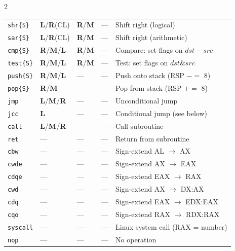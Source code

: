 \documentclass[landscape,a4paper]{article}
\newcommand{\Lc}{\textcolor{tL}{\textbf{L}}}
\newcommand{\Mc}{\textcolor{tM}{\textbf{M}}}
\newcommand{\Rc}{\textcolor{tR}{\textbf{R}}}
\begin{document}
\begin{tcolorbox}[mysec,
  title={Part 1: Instruction Set --- AT\&T: \texttt{op src, dst}
         \quad$|$\quad Intel: \texttt{op dst, src}}]
\begin{multicols}{2}
{\begin{tabular}{@{}l l l l p{9.5cm}@{}}
\texttt{shr\{S\}}  & \Lc/\Rc(CL) & \Rc/\Mc & --- & Shift right (logical) \\
\texttt{sar\{S\}}  & \Lc/\Rc(CL) & \Rc/\Mc & --- & Shift right (arithmetic) \\
\midrule
\texttt{cmp\{S\}}  & \Rc/\Mc/\Lc & \Rc/\Mc & ---
  & Compare: set flags on $dst - src$ \\
\texttt{test\{S\}} & \Rc/\Mc/\Lc & \Rc/\Mc & ---
  & Test: set flags on $dst \mathbin{\&} src$ \\
\midrule
\texttt{push\{S\}} & \Rc/\Mc/\Lc & --- & --- & Push onto stack (RSP $-=$ 8) \\
\texttt{pop\{S\}}  & \Rc/\Mc     & --- & --- & Pop from stack  (RSP $+=$ 8) \\
\midrule
\texttt{jmp}       & \Lc/\Mc/\Rc & --- & --- & Unconditional jump \\
\texttt{jcc}       & \Lc         & --- & --- & Conditional jump (see below) \\
\texttt{call}      & \Lc/\Mc/\Rc & --- & --- & Call subroutine \\
\texttt{ret}       & ---         & --- & --- & Return from subroutine \\
\midrule
\texttt{cbw}       & --- & --- & --- & Sign-extend AL $\to$ AX \\
\texttt{cwde}      & --- & --- & --- & Sign-extend AX $\to$ EAX \\
\texttt{cdqe}      & --- & --- & --- & Sign-extend EAX $\to$ RAX \\
\texttt{cwd}       & --- & --- & --- & Sign-extend AX $\to$ DX:AX \\
\texttt{cdq}       & --- & --- & --- & Sign-extend EAX $\to$ EDX:EAX \\
\texttt{cqo}       & --- & --- & --- & Sign-extend RAX $\to$ RDX:RAX \\
\midrule
\texttt{syscall}   & --- & --- & --- & Linux system call (RAX = number) \\
\texttt{nop}       & --- & --- & --- & No operation \\
\bottomrule
\end{tabular}
}

\columnbreak


\end{multicols}
\end{tcolorbox}
\end{document}
